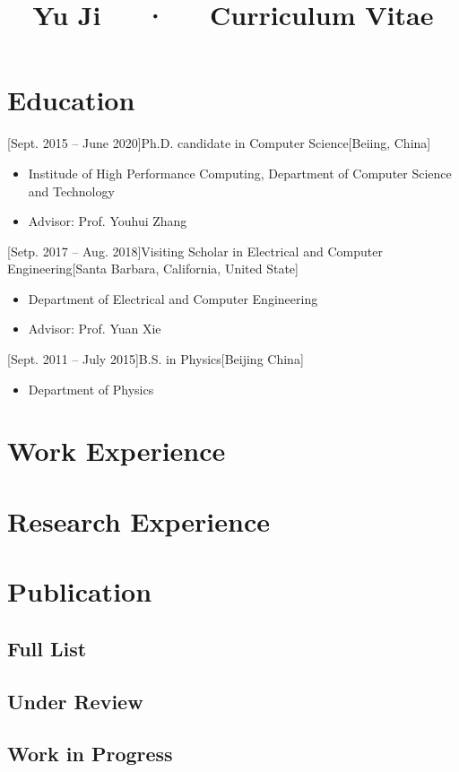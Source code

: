 \documentclass{modularcv}
\title{Yu Ji~~~·~~~Curriculum Vitae}
\begin{document}
\makecvheader
\makefooter
\section{Education}
[Sept. 2015 -- June 2020]{Ph.D. candidate in Computer Science}[Beiing, China]
\begin{itemize}
	\item Institude of High Performance Computing, Department of Computer Science and Technology
	\item Advisor: Prof. Youhui Zhang
\end{itemize}
[Setp. 2017 -- Aug. 2018]{Visiting Scholar in Electrical and Computer Engineering}[Santa Barbara, California, United State]
\begin{itemize}
	\item Department of Electrical and Computer Engineering
	\item Advisor: Prof. Yuan Xie
\end{itemize}
[Sept. 2011 -- July 2015]{B.S. in Physics}[Beijing China]
\begin{itemize}
	\item Department of Physics
\end{itemize}
\section{Work Experience}
\section{Research Experience}
\section{Publication}
\subsection{Full List}
\subsection{Under Review}
\subsection{Work in Progress}
\end{document}
